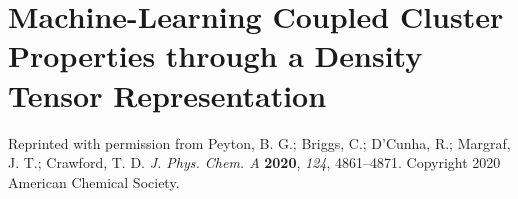 \chapter{Machine-Learning Coupled Cluster Properties through a Density Tensor Representation} \label{ch:p2}
Reprinted with permission from Peyton, B. G.; Briggs, C.; D’Cunha, R.; Margraf, J. T.; Crawford, T. D. \textit{J. Phys. Chem. A} \textbf{2020}, \textit{124}, 4861–4871. Copyright 2020 American Chemical Society.





